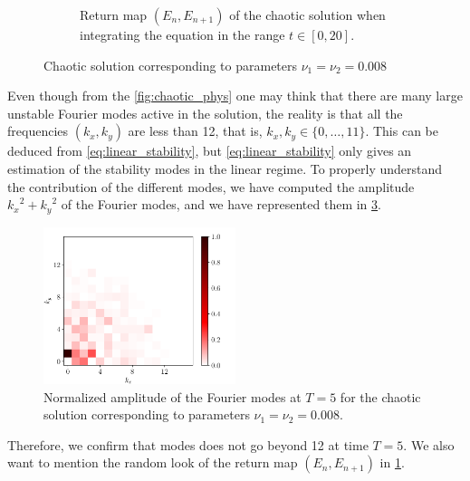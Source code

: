 \documentclass[twoside]{article}
\begin{document}
\begin{figure}[ht]
\begin{subfigure}[ht]{0.45\textwidth}
    \caption{Return map $(E_n,E_{n+1})$ of the chaotic solution when integrating the equation in the range $t\in[0,20]$.}
    \label{fig:chaotic_b}
  \end{subfigure}
  \caption{Chaotic solution corresponding to parameters $\nu_1=\nu_2=0.008$}
  \label{fig:chaotic}
\end{figure}

Even though from the \cref{fig:chaotic_phys} one may think that there are many large unstable Fourier modes active in the solution, the reality is that all the frequencies $(k_x,k_y)$ are less than 12, that is, $k_x,k_y\in\{0,\dots,11\}$. This can be deduced from \cref{eq:linear_stability}, but \cref{eq:linear_stability} only gives an estimation of the stability modes in the linear regime. To properly understand the contribution of the different modes, we have computed the amplitude ${k_x}^2+{k_y}^2$ of the Fourier modes, and we have represented them in \cref{fig:chaotic_modes}.

\begin{figure}[ht]
  \centering
  \includegraphics[width=0.5\textwidth]{images/slice_freq_nu1_0.008_nu2_0.008_time_5.0.pdf}
  \caption{Normalized amplitude of the Fourier modes at $T=5$ for the chaotic solution corresponding to parameters $\nu_1=\nu_2=0.008$.}
  \label{fig:chaotic_modes}
\end{figure}

Therefore, we confirm that modes does not go beyond 12 at time $T=5$. We also want to mention the random look of the return map $(E_n,E_{n+1})$ in \cref{fig:chaotic_b}.
\end{document}
